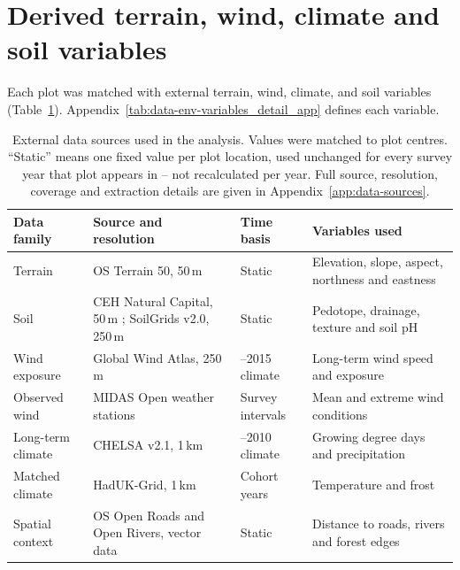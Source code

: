 \documentclass[logo,msc,ai]{infthesis}           %
\begin{document}
\section{Derived terrain, wind, climate and soil variables}
\label{sec:data-environmental}

Each plot was matched with external terrain, wind, climate, and soil variables (Table~\ref{tab:data-env-sources}). Appendix~\ref{tab:data-env-variables_detail_app} defines each variable.

\begin{table}[!htbp]
\centering
\scriptsize
\setlength{\tabcolsep}{4pt}
\renewcommand{\arraystretch}{1.05}

\begin{tabular}{
    >{\raggedright\arraybackslash}p{2.0cm}
    >{\raggedright\arraybackslash}p{4.2cm}
    >{\raggedright\arraybackslash}p{2.3cm}
    >{\raggedright\arraybackslash}p{4.0cm}
}
\hline
Data family & Source and resolution & Time basis & Variables used \\
\hline

Terrain
& OS Terrain 50, 50\,m \cite{ordnancesurveyTerrain50_C3_LID}
& Static
& Elevation, slope, aspect, northness and eastness \\

Soil
& CEH Natural Capital, 50\,m \cite{feeney2026CEHNaturalCapital_C3_LID}; SoilGrids v2.0, 250\,m \cite{poggio2021SoilGrids_C3_LID}
& Static
& Pedotope, drainage, texture and soil pH \\

Wind exposure
& Global Wind Atlas, 250\,m \cite{davis2023GlobalWindAtlas_C3_LID}
& 2006--2015 climate
& Long-term wind speed and exposure \\

Observed wind
& MIDAS Open weather stations \cite{metoffice2019MIDASOpen_C3_LID}
& Survey intervals
& Mean and extreme wind conditions \\

Long-term climate
& CHELSA v2.1, 1\,km \cite{karger2017CHELSA_C3_LID}
& 1981--2010 climate
& Growing degree days and precipitation \\

Matched climate
& HadUK-Grid, 1\,km \cite{hollis2019HadUKGrid_C3_LID}
& Cohort years
& Temperature and frost \\

Spatial context
& OS Open Roads and Open Rivers, vector data
\cite{ordnancesurveyOpenRoads_C3_LID,ordnancesurveyOpenRivers_C3_LID}
& Static
& Distance to roads, rivers and forest edges \\

\hline
\end{tabular}

\caption{\small{External data sources used in the analysis. Values were matched to plot centres. ``Static'' means one fixed value per plot location, used unchanged for every survey year that plot appears in -- not recalculated per year. Full source, resolution, coverage and extraction details are given in Appendix~\ref{app:data-sources}.}}
\label{tab:data-env-sources}
\end{table}
\end{document}
